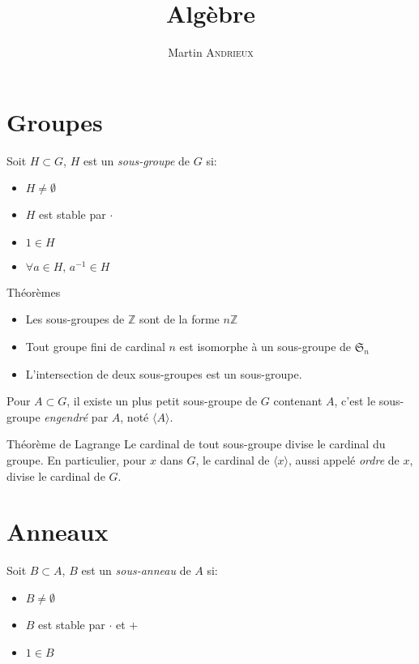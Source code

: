 \documentclass[french, a4paper, 11pt, twocolumn]{article}
\title{Algèbre}
\author{Martin \textsc{Andrieux}}
\date{}
\newcommand{\Z}{\mathbb{Z}}   %
\begin{document}
\maketitle

\section{Groupes}
\begin{definition}
  Soit $H\subset G$, $H$ est un \emph{sous-groupe} de $G$ si:
  \begin{itemize}[label=$\bullet$]
    \item $H\neq\emptyset$
    \item $H$ est stable par $\cdot$
    \item $1\in H$
    \item $\forall a \in H,\, a^{-1}\in H$
  \end{itemize}
\end{definition}

\begin{theoreme}{Théorèmes}
  \begin{itemize}[label=$\bullet$]
    \item Les sous-groupes de $\Z$ sont de la forme $n\Z$
    \item Tout groupe fini de cardinal $n$ est isomorphe à un sous-groupe de $\mathfrak S_{n}$
    \item L'intersection de deux sous-groupes est un sous-groupe.
  \end{itemize}
\end{theoreme}

\begin{definition}
  Pour $A\subset G$, il existe un plus petit sous-groupe de $G$ contenant $A$, c'est le sous-groupe \emph{engendré} par $A$, noté $\langle A\rangle$.
\end{definition}

\begin{theoreme}{Théorème de Lagrange}
  Le cardinal de tout sous-groupe divise le cardinal du groupe.
  \tcblower
  En particulier, pour $x$ dans $G$, le cardinal de $\langle x \rangle$, aussi appelé \emph{ordre} de $x$, divise le cardinal de $G$.
\end{theoreme}

\section{Anneaux}
\begin{definition}
  Soit $B\subset A$, $B$ est un \emph{sous-anneau} de $A$ si:
  \begin{itemize}[label=$\bullet$]
    \item $B\neq\emptyset$
    \item $B$ est stable par $\cdot$ et $+$
    \item $1\in B$
  \end{itemize}
\end{definition}
\end{document}
